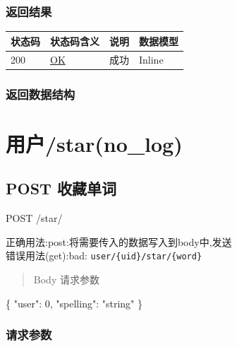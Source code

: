 \documentclass[
]{article}
\newenvironment{Shaded}{}{}
\newcommand{\DataTypeTok}[1]{\textcolor[rgb]{0.56,0.13,0.00}{#1}}
\newcommand{\DecValTok}[1]{\textcolor[rgb]{0.25,0.63,0.44}{#1}}
\newcommand{\FunctionTok}[1]{\textcolor[rgb]{0.02,0.16,0.49}{#1}}
\newcommand{\StringTok}[1]{\textcolor[rgb]{0.25,0.44,0.63}{#1}}
\begin{document}
\hypertarget{ux8fd4ux56deux7ed3ux679c-31}{%
\subsubsection{返回结果}\label{ux8fd4ux56deux7ed3ux679c-31}}

\begin{longtable}[]{@{}llll@{}}
\toprule
状态码 & 状态码含义 & 说明 & 数据模型 \\
\midrule
\endhead
200 & \href{https://tools.ietf.org/html/rfc7231\#section-6.3.1}{OK} &
成功 & Inline \\
\bottomrule
\end{longtable}

\hypertarget{ux8fd4ux56deux6570ux636eux7ed3ux6784-25}{%
\subsubsection{返回数据结构}\label{ux8fd4ux56deux6570ux636eux7ed3ux6784-25}}

\hypertarget{ux7528ux6237starnolog}{%
\section{用户/star(no\_log)}\label{ux7528ux6237starnolog}}

\hypertarget{post-ux6536ux85cfux5355ux8bcd-2}{%
\subsection{POST 收藏单词}\label{post-ux6536ux85cfux5355ux8bcd-2}}

POST /star/

正确用法:post:将需要传入的数据写入到body中,发送\\
错误用法(get):bad: \texttt{user/\{uid\}/star/\{word\}}

\begin{quote}
Body 请求参数
\end{quote}

\begin{Shaded}
\begin{Highlighting}[]
\FunctionTok{\{}
  \DataTypeTok{"user"}\FunctionTok{:} \DecValTok{0}\FunctionTok{,}
  \DataTypeTok{"spelling"}\FunctionTok{:} \StringTok{"string"}
\FunctionTok{\}}
\end{Highlighting}
\end{Shaded}

\hypertarget{ux8bf7ux6c42ux53c2ux6570-30}{%
\subsubsection{请求参数}\label{ux8bf7ux6c42ux53c2ux6570-30}}
\end{document}
